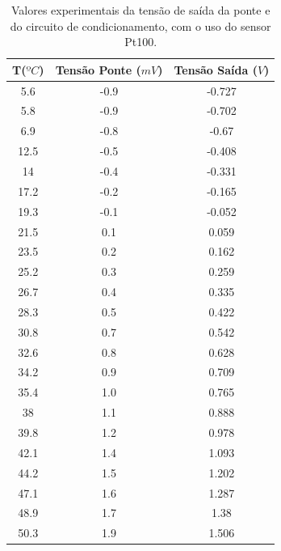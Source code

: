 \documentclass[a4paper]{instrumentacao}
\begin{document}
\begin{table}[H]
\centering
\caption{Valores experimentais da tensão de saída da ponte e do circuito de condicionamento, com o uso do sensor Pt100.}
\label{tab:termometro-experimento-pt100}
\begin{tabular}{|c|c|c|}
\hline
\textbf{T($ºC$)} & \textbf{Tensão Ponte ($mV$)} & \textbf{Tensão Saída ($V$)} \\ \hline
5.6            & -0.9                      & -0.727                    \\ \hline
5.8            & -0.9                      & -0.702                    \\ \hline
6.9            & -0.8                      & -0.67                     \\ \hline
12.5           & -0.5                      & -0.408                    \\ \hline
14             & -0.4                      & -0.331                    \\ \hline
17.2           & -0.2                      & -0.165                    \\ \hline
19.3           & -0.1                      & -0.052                    \\ \hline
21.5           & 0.1                       & 0.059                     \\ \hline
23.5           & 0.2                       & 0.162                     \\ \hline
25.2           & 0.3                       & 0.259                     \\ \hline
26.7           & 0.4                       & 0.335                     \\ \hline
28.3           & 0.5                       & 0.422                     \\ \hline
30.8           & 0.7                       & 0.542                     \\ \hline
32.6           & 0.8                       & 0.628                     \\ \hline
34.2           & 0.9                       & 0.709                     \\ \hline
35.4           & 1.0                       & 0.765                     \\ \hline
38             & 1.1                       & 0.888                     \\ \hline
39.8           & 1.2                       & 0.978                     \\ \hline
42.1           & 1.4                       & 1.093                     \\ \hline
44.2           & 1.5                       & 1.202                     \\ \hline
47.1           & 1.6                       & 1.287                     \\ \hline
48.9           & 1.7                       & 1.38                      \\ \hline
50.3           & 1.9                       & 1.506                     \\ \hline
\end{tabular}
\end{table}
\end{document}
